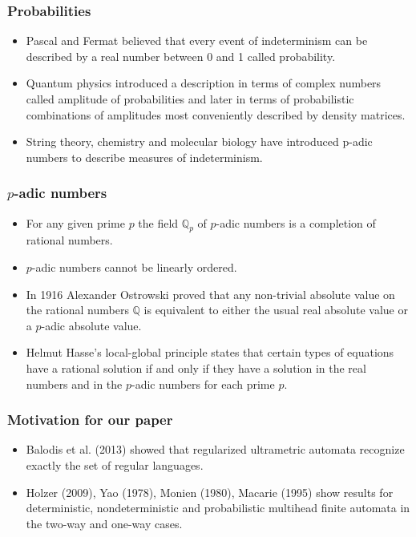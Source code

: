 \documentclass{beamer}
\begin{document}
\begin{frame}
\frametitle{Probabilities}
\begin{itemize}
\item Pascal and Fermat believed that every event of indeterminism can be described by a real number between 0 and 1 called probability.
\item Quantum physics introduced a description in terms of complex numbers called amplitude of probabilities and later in terms of probabilistic combinations of amplitudes most conveniently described by density matrices.
\item String theory, chemistry and molecular biology have introduced p-adic numbers to describe measures of indeterminism.
\end{itemize}
\end{frame}

\begin{frame}
\frametitle{$p$-adic numbers}
\begin{itemize}
	\item For any given prime $p$ the field $\mathbb{Q}_p$ of $p$-adic numbers is a completion of rational numbers.
	\item $p$-adic numbers cannot be linearly ordered.
	\item In 1916 Alexander Ostrowski 
proved that any non-trivial absolute value on the rational numbers $\mathbb{Q}$ is equivalent to either the usual real absolute value or a $p$-adic absolute value.
	\item Helmut Hasse's local-global principle
 states that certain types of equations have a rational solution if and only if they have a solution in the real numbers and in the $p$-adic numbers for each prime $p$.
\end{itemize}
\end{frame}

\begin{frame}
\frametitle{Motivation for our paper}
\begin{itemize}
	\item Balodis et al. (2013) showed that regularized ultrametric automata recognize exactly the set of regular languages.
	\item Holzer (2009), Yao (1978), Monien (1980), Macarie (1995) show results for deterministic, nondeterministic and probabilistic multihead finite automata in the two-way and one-way cases.
\end{itemize}
\end{frame}
\end{document}
